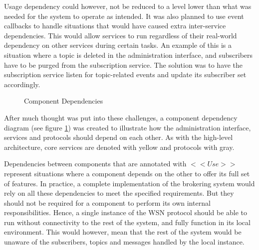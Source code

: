 Usage dependency could however, not be reduced to a level lower than what was needed for the system to operate as intended. It was also planned to use event callbacks to handle situations that would have caused extra inter-service dependencies. This would allow services to run regardless of their real-world dependency on other services during certain tasks. An example of this is a situation where a topic is deleted in the administration interface, and subscribers have to be purged from the subscription service. The solution was to have the subscription service listen for topic-related events and update its subscriber set accordingly.

\begin{center}
  \begin{figure}[ht!]
    \caption{Component Dependencies}
    \label{fig:architecture_dependency}
  \end{figure}
\end{center}

After much thought was put into these challenges, a component dependency diagram (see figure \ref{fig:architecture_dependency}) was created to illustrate how the administration interface, services and protocols should depend on each other. As with the high-level architecture, core services are denoted with yellow and protocols with gray.

Dependencies between components that are annotated with $<< Use >>$ represent situations where a component depends on the other to offer its full set of features. In practice, a complete implementation of the brokering system would rely on all these dependencies to meet the specified requirements. But they should not be required for a component to perform its own internal responsibilities. Hence, a single instance of the WSN protocol should be able to run without connectivity to the rest of the system, and fully function in its local environment. This would however, mean that the rest of the system would be unaware of the subscribers, topics and messages handled by the local instance.

